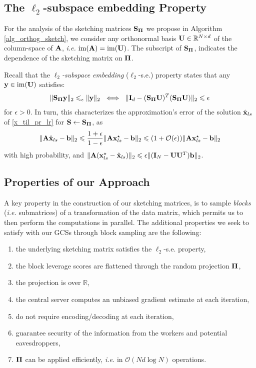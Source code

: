 \documentclass[journal,letterpaper,onecolumn,twoside,nofonttune]{IEEEtran}
\newcommand{\ow}{\mathcal{O}}
\newcommand{\Ub}{\bold{U}}
\newcommand{\xb}{\bold{x}}
\newcommand{\xbh}{{\hat{\bold{x}}}}
\newcommand{\yb}{\bold{y}}
\newcommand{\Pibold}{\bold{\Pi}}
\newcommand{\R}{\mathbb{R}}
\newcommand{\Sb}{\bold{S}}
\newcommand{\SbPi}{\Sb_{\Pibold}}
\newcommand{\Ab}{\bold{A}}
\newcommand{\bb}{\bold{b}}
\newcommand{\Ib}{\bold{I}}
\newcommand{\image}{\mathrm{im}}
\begin{document}
\subsection{The $\ell_2$-subspace embedding Property}
\label{embedding_subs}

For the analysis of the sketching matrices $\SbPi$ we propose in Algorithm \ref{alg_orthog_sketch}, we consider any orthonormal basis $\Ub\in\R^{N\times d}$ of the column-space of $\Ab$, \textit{i.e.} $\image(\Ab)=\image(\Ub)$. The subscript of $\SbPi$, indicates the dependence of the sketching matrix on $\Pibold$.

Recall that the \textit{$\ell_2$-subspace embedding} ($\ell_2$-s.e.) property \cite{Woo14,ERNM22} states that any $\yb\in\image(\Ub)$ satisfies:
\begin{align}
\label{subsp_emb_id}
  \|\SbPi\yb\|_2\leqslant_\epsilon\|\yb\|_2  \ \iff \ \|\Ib_d-(\SbPi\Ub)^T(\SbPi\Ub)\|_2\leqslant \epsilon
\end{align}
for $\epsilon>0$. In turn, this characterizes the approximation's error of the solution $\xbh_{ls}$ of \eqref{x_til_pr_lr} for $\Sb\gets\SbPi$, as
$$ \|\Ab\xbh_{ls}-\bb\|_2 \leqslant \frac{1+\epsilon}{1-\epsilon}\|\Ab\xb_{ls}^{\star}-\bb\|_2 \leqslant (1+\ow(\epsilon))\|\Ab\xb_{ls}^{\star}-\bb\|_2 $$
with high probability, and $\|\Ab(\xb_{ls}^{\star}-\xbh_{ls})\|_2\leqslant\epsilon\|(\Ib_N-\Ub\Ub^T)\bb\|_2$.

\subsection{Properties of our Approach}

A key property in the construction of our sketching matrices, is to sample \textit{blocks} (\textit{i.e.} submatrices) of a transformation of the data matrix, which permits us to then perform the computations in parallel. The additional properties we seek to satisfy with our GCSs through block sampling are the following:
\begin{enumerate}[label=(\alph*)]%
  \item the underlying sketching matrix satisfies the $\ell_2$-s.e. property,
  \item the block leverage scores are flattened through the random projection $\Pibold$,
  \item the projection is over $\R$,
  \item the central server computes an unbiased gradient estimate at each iteration,
  \item do not require encoding/decoding at each iteration,
  \item guarantee security of the information from the workers and potential eavesdroppers,
  \item $\Pibold$ can be applied efficiently, \textit{i.e.} in $\ow(Nd\log N)$ operations.
\end{enumerate}
\end{document}
